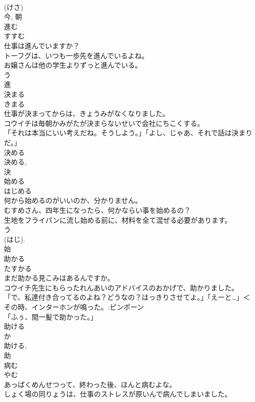 \documentclass[8pt]{extreport}
\begin{document}
\begin{CJK}{UTF8}{min}
\\	(けさ) 
\\	今, 朝	
\\	進む	
\\	すすむ	
\\	仕事は進んでいますか？	
\\	トーフグは、いつも一歩先を進んでいるよね。	
\\	お嬢さんは他の学生よりずっと進んでいる。	
\\	う 
\\	進	
\\	決まる	
\\	きまる	
\\	仕事が決まってからは、きょうみがなくなりました。	
\\	コウイチは毎朝かみがたが決まらないせいで会社にちこくする。	
\\	「それは本当にいい考えだね。そうしよう。」「よし、じゃあ、それで話は決まりだ。」	
\\	決める 
\\	決める, 
\\	決	
\\	始める	
\\	はじめる	
\\	何から始めるのがいいのか、分かりません。	
\\	むすめさん、四年生になったら、何かならい事を始めるの？	
\\	生地をフライパンに流し始める前に、材料を全て混ぜる必要があります。	
\\	う 
\\	(はじ). 
\\	始	
\\	助かる	
\\	たすかる	
\\	まだ助かる見こみはあるんですか。	
\\	コウイチ先生にもらったれんあいのアドバイスのおかげで、助かりました。	
\\	「で、私達付き合ってるのよね？どうなの？はっきりさせてよ。」「えーと…」＜その時、インターホンが鳴った。:ピンポーン
\\	「ふぅ、間一髪で助かった。」	
\\	助ける 
\\	か 
\\	助ける, 
\\	助	
\\	病む	
\\	やむ	
\\	あっぱくめんせつって、終わった後、ほんと病むよな。	
\\	しょく場の同りょうは、仕事のストレスが原いんで病んでしまいました。	

\end{CJK}
\end{document}

